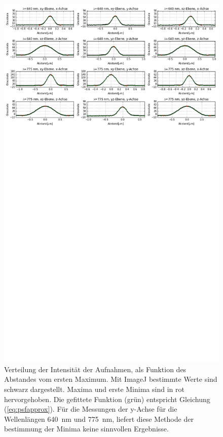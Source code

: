 \begin{figure}
	\centering
	\includegraphics[trim= 0 950 0 0, width=\textwidth]{plots/goldbeads.png}
	\caption{Verteilung der Intensität der Aufnahmen, als Funktion des Abstandes vom ersten Maximum. Mit ImageJ bestimmte Werte sind schwarz dargestellt. 
		Maxima und erste Minima sind in rot hervorgehoben. 
		Die gefittete Funktion (grün) entspricht Gleichung (\ref{eq:psfapprox}). 
		Für die Messungen der y-Achse für die Wellenlängen 640~nm und 775~nm, liefert diese Methode der bestimmung der Minima keine sinnvollen Ergebnisse.
	}\label{fig:psffits}
\end{figure}

